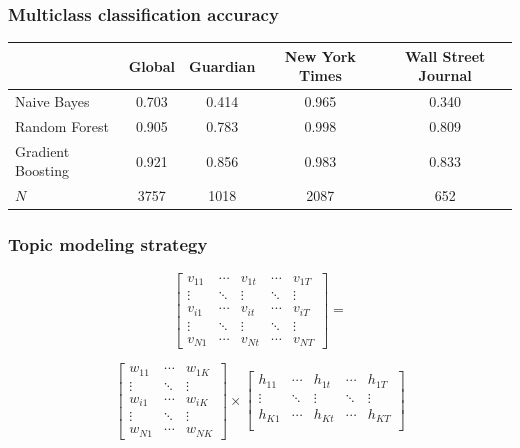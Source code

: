 \documentclass[11pt]{beamer}
\begin{document}
\begin{frame}
\frametitle{Multiclass classification accuracy}

\begin{table}
\centering
\scriptsize 
\begin{tabular}{lcccc}
\toprule
				& Global		& Guardian 	& New York Times	& Wall Street Journal	\\ 
\midrule
Naive Bayes 		& 0.703		& 0.414		& 0.965	 		& 0.340				\\
Random Forest		& 0.905		& 0.783		& 0.998			& 0.809 				\\ 
Gradient Boosting	& 0.921		& 0.856		& 0.983			& 0.833				\\ 
$N$				& 3757    		& 1018		& 2087 			& 652	 			\\
\bottomrule
\end{tabular}
\end{table}

\end{frame}


\begin{frame}
\frametitle{Topic modeling strategy}

\[
\begin{bmatrix}
        		v_{11} & \cdots & v_{1t} & \cdots & v_{1T} \\
		\vdots & \ddots & \vdots & \ddots & \vdots\\
		v_{i1} & \cdots & v_{it} & \cdots & v_{iT} \\
        		\vdots & \ddots & \vdots & \ddots & \vdots\\
        		v_{N1} & \cdots & v_{Nt} & \cdots & v_{NT}
\end{bmatrix}
=
\]

\[
\begin{bmatrix}
        		w_{11} & \cdots & w_{1K} \\
		\vdots & \ddots & \vdots \\
		w_{i1} & \cdots & w_{iK} \\
        		\vdots & \ddots & \vdots\\
        		w_{N1} & \cdots & w_{NK}
\end{bmatrix}
\times 
\begin{bmatrix}
        		h_{11} & \cdots & h_{1t} & \cdots & h_{1T} \\
		\vdots & \ddots & \vdots & \ddots & \vdots\\
		h_{K1} & \cdots & h_{Kt} & \cdots & h_{KT} \\
\end{bmatrix}
\]

\end{frame}
\end{document}
